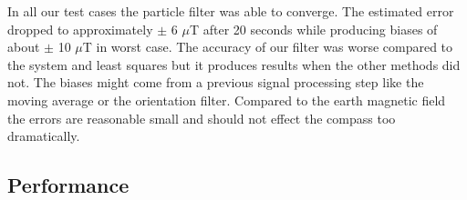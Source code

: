 \begin{table}[H]
    \centering
    \caption{Estimated hard iron bias in $\mu T$ with different methods on the LG Nexus 5X.}
    \label{tbl:eval_simulation_nexus5x}
\end{table}

In all our test cases the particle filter was able to converge. The estimated error dropped to approximately $\pm$ 6 $\mu$T after 20 seconds while producing biases of about $\pm$ 10 $\mu$T in worst case. The accuracy of our filter was worse compared to the system and least squares but it produces results when the other methods did not. The biases might come from a previous signal processing step like the moving average or the orientation filter. Compared to the earth magnetic field the errors are reasonable small and should not effect the compass too dramatically.

\subsection{Performance}

